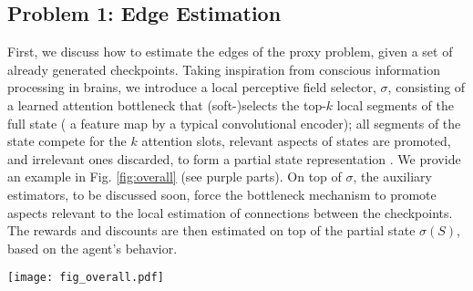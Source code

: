 \subsection{Problem 1: Edge Estimation}

First, we discuss how to estimate the edges of the proxy problem, given a set of already generated checkpoints.
Taking inspiration from conscious information processing in brains, we introduce a local perceptive field selector, $\sigma$, consisting of a learned attention bottleneck that (soft-)selects the top-$k$ local segments of the full state (\eg{} a feature map by a typical convolutional encoder); all segments of the state compete for the $k$ attention slots, \ie{} relevant aspects of states are promoted, and irrelevant ones discarded, to form a partial state representation \citep{mott2019towards,tang2020neuroevolution,zhao2021consciousness,alver2023minimal}. We provide an example in Fig. \ref{fig:overall} (see purple parts). On top of $\sigma$, the auxiliary estimators, to be discussed soon, force the bottleneck mechanism to promote aspects relevant to the local estimation of connections between the checkpoints. The rewards and discounts are then estimated on top of the partial state $\sigma(S)$, based on the agent's behavior. 

\begin{figure*}[htbp]
\centering
\vspace*{-3mm}
\captionsetup{justification = centering}
\texttt{[image: fig\_overall.pdf]}
\vspace*{-5mm}
\caption{\small \textbf{\agentshort{} Framework}: 1) Partial states consist of a few local fields, soft-selected via top-$k$ attention \citep{gupta2021memory}. \agentshort{}'s edge estimations as well as low-level behaviors \red{$\pi$} are solely based on the partial states. 2) The checkpoint generator learns by splitting the full state into context and partial descriptions, and fusing them to reconstruct the input. It generates checkpoints by sampling partial descriptions and combines them with the episodic contexts; 3) We prune the vertices and edges of the denser graphs to extract sparse proxy problems. Once a plan is formed, the immediate checkpoint target is used to condition the policy, which then guides the actions. In the proxy problem example, blue edges are estimated to be bidirectional and red edges are unidirectional (with the other direction pruned).}
\label{fig:overall}
\vspace*{-2mm}
\end{figure*}

